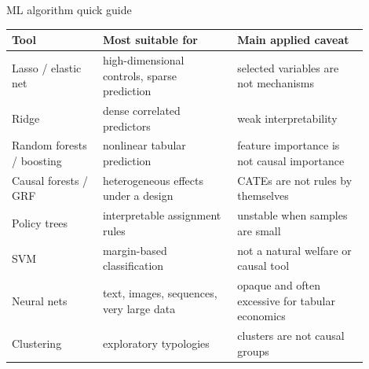\documentclass[aspectratio=169,11pt]{beamer}
\newcommand{\1}{\mathbf{1}}
\begin{document}
\begin{frame}{ML algorithm quick guide}
\scriptsize
\begin{tabular}{p{0.23\linewidth} p{0.34\linewidth} p{0.33\linewidth}}
\toprule
Tool & Most suitable for & Main applied caveat \\
\midrule
Lasso / elastic net & high-dimensional controls, sparse prediction & selected variables are not mechanisms \\
Ridge & dense correlated predictors & weak interpretability \\
Random forests / boosting & nonlinear tabular prediction & feature importance is not causal importance \\
Causal forests / GRF & heterogeneous effects under a design & CATEs are not rules by themselves \\
Policy trees & interpretable assignment rules & unstable when samples are small \\
SVM & margin-based classification & not a natural welfare or causal tool \\
Neural nets & text, images, sequences, very large data & opaque and often excessive for tabular economics \\
Clustering & exploratory typologies & clusters are not causal groups \\
\bottomrule
\end{tabular}
\end{frame}
\end{document}
